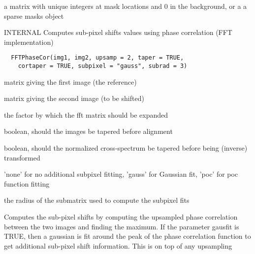 \documentclass[a4paper]{book}
\begin{document}
%
\begin{Value}
a matrix with unique integers at mask locations and 0 in
the background, or a a sparse masks object
\end{Value}
%
\begin{Description}\relax
INTERNAL Computes sub-pixel shifts values using phase
correlation (FFT implementation)
\end{Description}
%
\begin{Usage}
\begin{verbatim}
  FFTPhaseCor(img1, img2, upsamp = 2, taper = TRUE,
    cortaper = TRUE, subpixel = "gauss", subrad = 3)
\end{verbatim}
\end{Usage}
%
\begin{Arguments}
\begin{ldescription}
\item[\code{img1}] matrix giving the first image (the
reference)

\item[\code{img2}] matrix giving the second image (to be
shifted)

\item[\code{upsamp}] the factor by which the fft matrix should
be expanded

\item[\code{taper}] boolean, should the images be tapered before
alignment

\item[\code{cortaper}] boolean, should the normalized
cross-spectrum be tapered before being (inverse)
transformed

\item[\code{subpixel}] 'none' for no additional subpixel
fitting, 'gauss' for Gaussian fit, 'poc' for poc function
fitting

\item[\code{subrad}] the radius of the submatrix used to compute
the subpixel fits
\end{ldescription}
\end{Arguments}
%
\begin{Details}\relax
Computes the sub-pixel shifts by computing the upsampled
phase correlation between the two images and finding the
maximum.  If the parameter gausfit is TRUE, then a
gaussian is fit around the peak of the phase correlation
function to get additional sub-pixel shift information.
This is on top of any upsampling
\end{Details}
\end{document}
